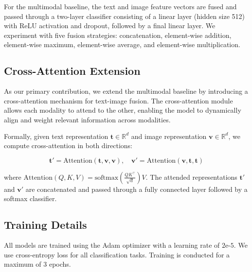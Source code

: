 For the multimodal baseline, the text and image feature vectors are fused and passed through a two-layer classifier consisting of a linear layer (hidden size 512) with ReLU activation and dropout, followed by a final linear layer. We experiment with five fusion strategies: concatenation, element-wise addition, element-wise maximum, element-wise average, and element-wise multiplication.

\subsection{Cross-Attention Extension}

As our primary contribution, we extend the multimodal baseline by introducing a cross-attention mechanism for text-image fusion. The cross-attention module allows each modality to attend to the other, enabling the model to dynamically align and weight relevant information across modalities.

Formally, given text representation $\mathbf{t} \in \mathbb{R}^d$ and image representation $\mathbf{v} \in \mathbb{R}^d$, we compute cross-attention in both directions:

\begin{equation}
    \mathbf{t}' = \text{Attention}(\mathbf{t}, \mathbf{v}, \mathbf{v}), \quad \mathbf{v}' = \text{Attention}(\mathbf{v}, \mathbf{t}, \mathbf{t})
\end{equation}

where $\text{Attention}(Q, K, V) = \text{softmax}\left(\frac{QK^\top}{\sqrt{d}}\right)V$. The attended representations $\mathbf{t}'$ and $\mathbf{v}'$ are concatenated and passed through a fully connected layer followed by a softmax classifier.

\subsection{Training Details}

All models are trained using the Adam optimizer \cite{kingma-2014} with a learning rate of $2\text{e-}5$. We use cross-entropy loss for all classification tasks. Training is conducted for a maximum of 3 epochs.